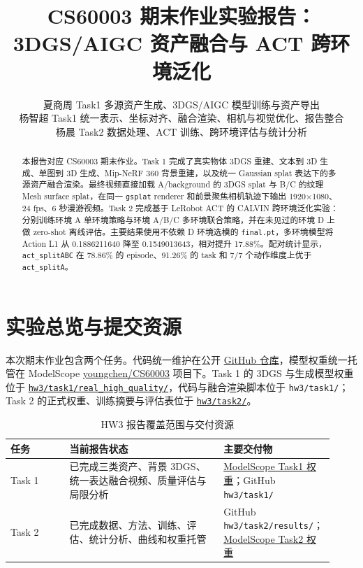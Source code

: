\documentclass[lang=cn,a4paper,newtx,nofont,code=minted]{elegantpaper}
\title{CS60003 期末作业实验报告：3DGS/AIGC 资产融合与 ACT 跨环境泛化}
\author{夏商周 \quad 25210980114 \quad Task1 多源资产生成、3DGS/AIGC 模型训练与资产导出 \\ 杨智超 \quad 25210980124 \quad Task1 统一表示、坐标对齐、融合渲染、相机与视觉优化、报告整合 \\ 杨晨 \quad 25210980120 \quad Task2 数据处理、ACT 训练、跨环境评估与统计分析}
\institute{\href{https://github.com/YangChen-pro/CS60003}{代码仓库}\quad|\quad\href{https://modelscope.cn/models/youngchen/CS60003/}{模型仓库}}
\date{\zhdate{2026/06/17}}
\begin{document}
\maketitle

\begin{abstract}
本报告对应 CS60003 期末作业。Task 1 完成了真实物体 3DGS 重建、文本到 3D 生成、单图到 3D 生成、Mip-NeRF 360 背景重建，以及统一 Gaussian splat 表达下的多源资产融合渲染。最终视频直接加载 A/background 的 3DGS splat 与 B/C 的纹理 Mesh surface splat，在同一 \texttt{gsplat} renderer 和前景聚焦相机轨迹下输出 1920$\times$1080、24 fps、6 秒漫游视频。Task 2 完成基于 LeRobot ACT 的 CALVIN 跨环境泛化实验：分别训练环境 A 单环境策略与环境 A/B/C 多环境联合策略，并在未见过的环境 D 上做 zero-shot 离线评估。主要结果使用不依赖 D 环境选模的 \texttt{final.pt}，多环境模型将 Action L1 从 0.1886211640 降至 0.1549013643，相对提升 17.88\%。配对统计显示，\texttt{act\_splitABC} 在 78.86\% 的 episode、91.26\% 的 task 和 7/7 个动作维度上优于 \texttt{act\_splitA}。
\end{abstract}

\section{实验总览与提交资源}

本次期末作业包含两个任务。代码统一维护在公开 \href{https://github.com/YangChen-pro/CS60003/tree/main/hw3}{GitHub 仓库}，模型权重统一托管在 ModelScope \href{https://modelscope.cn/models/youngchen/CS60003/}{youngchen/CS60003} 项目下。Task 1 的 3DGS 与生成模型权重位于 \href{https://modelscope.cn/models/youngchen/CS60003/tree/master/hw3/task1/real_high_quality}{\texttt{hw3/task1/real\_high\_quality/}}，代码与融合渲染脚本位于 \texttt{hw3/task1/}；Task 2 的正式权重、训练摘要与评估表位于 \href{https://modelscope.cn/models/youngchen/CS60003/tree/master/hw3/task2}{\texttt{hw3/task2/}}。

\begin{table}[!htbp]
\centering
\small
\caption{HW3 报告覆盖范围与交付资源}
\label{tab:overview}
\begin{tabular}{@{}L{0.18\linewidth}L{0.47\linewidth}L{0.27\linewidth}@{}}
\toprule
任务 & 当前报告状态 & 主要交付物 \\
\midrule
Task 1 & 已完成三类资产、背景 3DGS、统一表达融合视频、质量评估与局限分析 & \href{https://modelscope.cn/models/youngchen/CS60003/tree/master/hw3/task1/real_high_quality}{ModelScope Task1 权重}；GitHub \texttt{hw3/task1/} \\
Task 2 & 已完成数据、方法、训练、评估、统计分析、曲线和权重托管 & GitHub \texttt{hw3/task2/results/}；\href{https://modelscope.cn/models/youngchen/CS60003/tree/master/hw3/task2}{ModelScope Task2 权重} \\
\bottomrule
\end{tabular}
\end{table}
\end{document}

